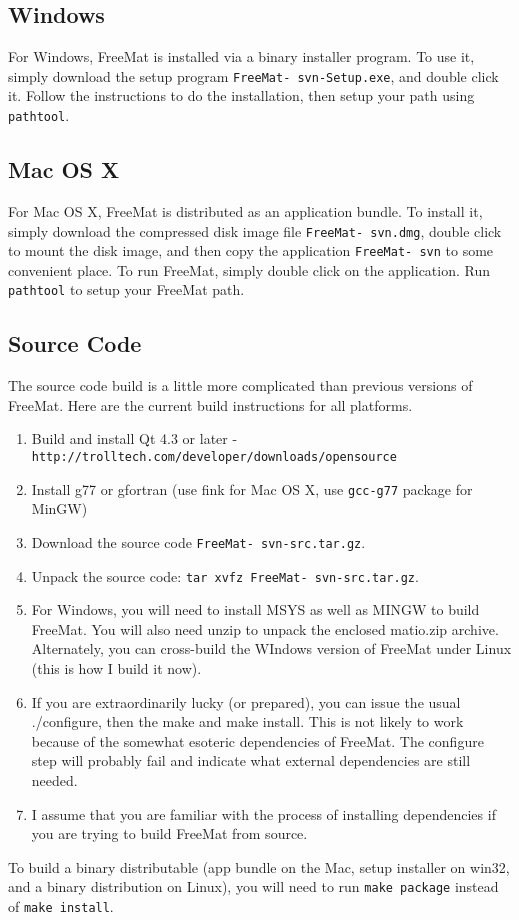 \subsection{Windows}

For Windows, FreeMat is installed via a binary installer program.  To use it,
simply download the setup program \verb|FreeMat- svn-Setup.exe|, and double
click it.  Follow the instructions to do the installation, then setup your path
using \verb|pathtool|.
\subsection{Mac OS X}

For Mac OS X, FreeMat is distributed as an application bundle.  To install it,
simply download the compressed disk image file \verb|FreeMat- svn.dmg|, double
click to mount the disk image, and then copy the application \verb|FreeMat- svn| to
some convenient place.  To run FreeMat, simply double click on the application.  Run
\verb|pathtool| to setup your FreeMat path.
\subsection{Source Code}

The source code build is a little more complicated than previous versions of FreeMat.  Here
are the current build instructions for all platforms.
\begin{enumerate}
\item  Build and install Qt 4.3 or later - \verb|http://trolltech.com/developer/downloads/opensource|

\item  Install g77 or gfortran (use fink for Mac OS X, use \verb|gcc-g77| package for MinGW)

\item  Download the source code \verb|FreeMat- svn-src.tar.gz|.

\item  Unpack the source code: \verb|tar xvfz FreeMat- svn-src.tar.gz|.

\item  For Windows, you will need to install MSYS as well as MINGW to
build FreeMat.  You will also need unzip to unpack the enclosed
matio.zip archive.  Alternately, you can cross-build the WIndows version
of FreeMat under Linux (this is how I build it now).

\item  If you are extraordinarily lucky (or prepared), you can issue the
usual ./configure, then the make and make install.
This is not likely to work
because of the somewhat esoteric dependencies of FreeMat.  The configure
step will probably fail and indicate what external dependencies are
still needed. 

\item  I assume that you are familiar with the process of installing 
dependencies if you are trying to build FreeMat from source.

\end{enumerate}
To build a binary distributable (app bundle on the Mac, setup
installer on win32, and a binary distribution on Linux), you will
need to run \verb|make package| instead of \verb|make install|.
